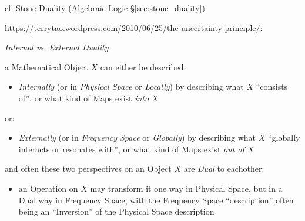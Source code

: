 cf. Stone Duality (Algebraic Logic \S\ref{sec:stone_duality})

\url{https://terrytao.wordpress.com/2010/06/25/the-uncertainty-principle/}:

\emph{Internal vs. External Duality}

a Mathematical Object $X$ can either be described:
\begin{itemize}
\item \emph{Internally} (or in \emph{Physical Space} or \emph{Locally}) by
  describing what $X$ ``consists of'', or what kind of Maps exist \emph{into}
  $X$
\end{itemize}
or:
\begin{itemize}
\item \emph{Externally} (or in \emph{Frequency Space} or \emph{Globally}) by
  describing what $X$ ``globally interacts or resonates with'', or what kind of
  Maps exist \emph{out of} $X$
\end{itemize}
and often these two perspectives on an Object $X$ are \emph{Dual} to eachother:
\begin{itemize}
\item an Operation on $X$ may transform it one way in Physical Space, but in a
  Dual way in Frequency Space, with the Frequency Space ``description'' often
  being an ``Inversion'' of the Physical Space description
\end{itemize}

